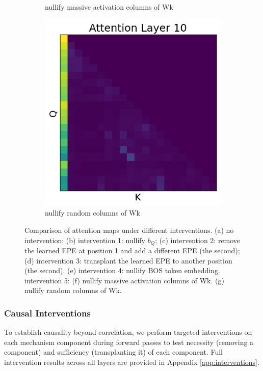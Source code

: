 \documentclass[11pt]{article}
\begin{document}
\begin{figure}[t!]
\begin{subfigure}[t]{0.22\textwidth}
    \caption{nullify massive activation columns of Wk}
    \label{fig:intervention5}
  \end{subfigure}
    \begin{subfigure}[t]{0.22\textwidth}
    \centering
    \includegraphics[width=0.85\columnwidth]{figures/obs4_intervention5_2.png}
    \caption{nullify random columns of Wk}
    \label{fig:intervention5_2}
  \end{subfigure}

  \caption{Comparison of attention maps under different interventions. (a) no intervention; (b) intervention 1: nullify $b_Q$; (c) intervention 2: remove the learned EPE at position 1 and add a different EPE (the second); (d) intervention 3: transplant the learned EPE to another position (the second). (e) intervention 4: nullify BOS token embedding. intervention 5: (f) nullify massive activation columns of Wk. (g) nullify random columns of Wk.}
  \label{fig:interventions_comparison}
\end{figure}


\subsubsection{Causal Interventions}
\label{sec:interventions}
To establish causality beyond correlation, we perform targeted 
interventions on each mechanism component during forward passes to test necessity (removing a component) and sufficiency (transplanting it) of each component. Full intervention results across all layers are provided in Appendix \ref{app:interventions}.
\end{document}
